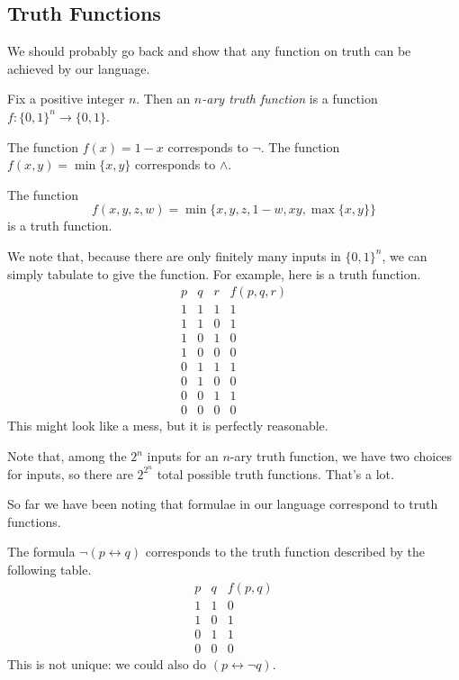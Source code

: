 \documentclass[../notes.tex]{subfiles}
\begin{document}
\subsection{Truth Functions}
We should probably go back and show that any function on truth can be achieved by our language.
\begin{definition}
	Fix a positive integer $n$. Then an \textit{$n$-ary truth function} is a function $f:\{0,1\}^n\to\{0,1\}$.
\end{definition}
\begin{ex}
	The function $f(x)=1-x$ corresponds to $\lnot$. The function $f(x,y)=\min\{x,y\}$ corresponds to $\land$.
\end{ex}
\begin{example}
	The function
	\[f(x,y,z,w)=\min\{x,y,z,1-w,xy,\max\{x,y\}\}\]
	is a truth function.
\end{example}
We note that, because there are only finitely many inputs in $\{0,1\}^n$, we can simply tabulate to give the function. For example, here is a truth function.
\[\begin{array}{c|c|c||c}
	p & q & r & f(p,q,r) \\
	\hline
	1 & 1 & 1 & 1 \\
	1 & 1 & 0 & 1 \\
	1 & 0 & 1 & 0 \\
	1 & 0 & 0 & 0 \\
	0 & 1 & 1 & 1 \\
	0 & 1 & 0 & 0 \\
	0 & 0 & 1 & 1 \\
	0 & 0 & 0 & 0
\end{array}\]
This might look like a mess, but it is perfectly reasonable.
\begin{remark}
	Note that, among the $2^n$ inputs for an $n$-ary truth function, we have two choices for inputs, so there are $2^{2^n}$ total possible truth functions. That's a lot.
\end{remark}
So far we have been noting that formulae in our language correspond to truth functions.
\begin{ex}
	The formula $\lnot(p\leftrightarrow q)$ corresponds to the truth function described by the following table.
	\[\begin{array}{c|c||c}
		p & q & f(p,q) \\
		\hline
		1 & 1 & 0 \\
		1 & 0 & 1 \\
		0 & 1 & 1 \\
		0 & 0 & 0
	\end{array}\]
	This is not unique: we could also do $(p\leftrightarrow\lnot q)$.
\end{ex}
\end{document}
